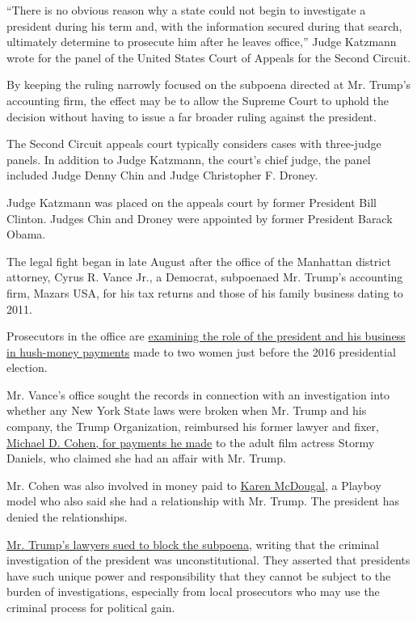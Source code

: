 ``There is no obvious reason why a state could not begin to investigate
a president during his term and, with the information secured during
that search, ultimately determine to prosecute him after he leaves
office,'' Judge Katzmann wrote for the panel of the United States Court
of Appeals for the Second Circuit.

By keeping the ruling narrowly focused on the subpoena directed at Mr.
Trump's accounting firm, the effect may be to allow the Supreme Court to
uphold the decision without having to issue a far broader ruling against
the president.

The Second Circuit appeals court typically considers cases with
three-judge panels. In addition to Judge Katzmann, the court's chief
judge, the panel included Judge Denny Chin and Judge Christopher F.
Droney.

Judge Katzmann was placed on the appeals court by former President Bill
Clinton. Judges Chin and Droney were appointed by former President
Barack Obama.

The legal fight began in late August after the office of the Manhattan
district attorney, Cyrus R. Vance Jr., a Democrat, subpoenaed Mr.
Trump's accounting firm, Mazars USA, for his tax returns and those of
his family business dating to 2011.

Prosecutors in the office are
\href{https://www.nytimes.com/2019/08/01/nyregion/trump-cohen-stormy-daniels-vance.html}{examining
the role of the president and his business in hush-money payments} made
to two women just before the 2016 presidential election.

Mr. Vance's office sought the records in connection with an
investigation into whether any New York State laws were broken when Mr.
Trump and his company, the Trump Organization, reimbursed his former
lawyer and fixer,
\href{https://www.nytimes.com/2018/11/29/nyregion/michael-cohen-trump-russia-mueller.html}{Michael
D. Cohen, for payments he made} to the adult film actress Stormy
Daniels, who claimed she had an affair with Mr. Trump.

Mr. Cohen was also involved in money paid to
\href{https://www.nytimes.com/2019/12/05/us/fox-news-mcdougal.html}{Karen
McDougal}, a Playboy model who also said she had a relationship with Mr.
Trump. The president has denied the relationships.

\href{https://www.nytimes.com/2019/09/19/nyregion/trump-tax-returns-lawsuit.html}{Mr.
Trump's lawyers sued to block the subpoena}, writing that the criminal
investigation of the president was unconstitutional. They asserted that
presidents have such unique power and responsibility that they cannot be
subject to the burden of investigations, especially from local
prosecutors who may use the criminal process for political gain.

